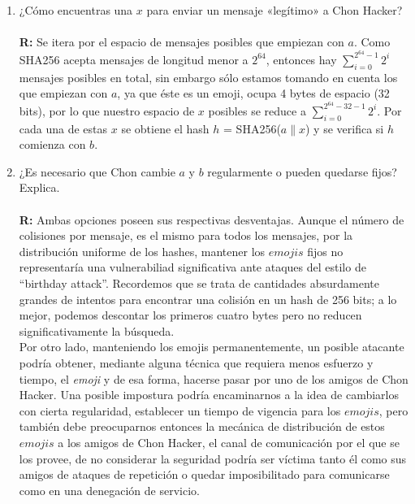 \documentclass[14pt]{article}
\begin{document}
\begin{enumerate}[label=\alph*)]
\item ¿Cómo encuentras una $x$ para enviar un mensaje «legítimo» a Chon Hacker? \\ \\
\textbf{R:} Se itera por el espacio de mensajes posibles que empiezan con $a$. Como SHA256 acepta mensajes de longitud menor a $2^{64}$, entonces hay $\sum_{i = 0}^{2^{64} - 1} 2^i$ mensajes posibles en total, sin embargo sólo estamos tomando en cuenta los que empiezan con $a$, ya que éste es un emoji, ocupa 4 bytes de espacio (32 bits), por lo que nuestro espacio de $x$ posibles se reduce a $\sum_{i = 0}^{2^{64} - 32 - 1} 2^i$. Por cada una de estas $x$ se obtiene el hash $h$ = SHA256($a \parallel x$)  y se verifica si $h$ comienza con $b$.

\item ¿Es necesario que Chon cambie $a$ y $b$ regularmente o pueden quedarse fijos? Explica. \\ \\
  \textbf{R:} Ambas opciones poseen sus respectivas desventajas. Aunque el número de colisiones por mensaje, es el mismo para todos los mensajes, por la distribución uniforme de los hashes, mantener
  los $emojis$ fijos no representaría una vulnerabiliad significativa ante ataques del estilo de ``birthday attack''. Recordemos que se trata de cantidades absurdamente grandes de intentos para encontrar
  una colisión en un hash de 256 bits; a lo mejor, podemos descontar los primeros cuatro bytes pero
  no reducen significativamente la búsqueda. \\

  Por otro lado, manteniendo los emojis permanentemente, un posible atacante podría obtener, mediante alguna técnica que requiera menos esfuerzo y tiempo, el \textit{emoji} y de esa forma, hacerse pasar por uno de los amigos de Chon Hacker. Una posible impostura
  podría encaminarnos a la idea de cambiarlos con cierta regularidad, establecer un tiempo de vigencia
  para los $emojis$, pero también debe preocuparnos entonces la mecánica de distribución de estos $emojis$ a los amigos de Chon Hacker, el canal de comunicación por el que se los provee, de no considerar
  la seguridad podría ser víctima tanto él como sus amigos de ataques de repetición o quedar imposibilitado para comunicarse como en una denegación de servicio. \\
  

\end{enumerate}
\end{document}
